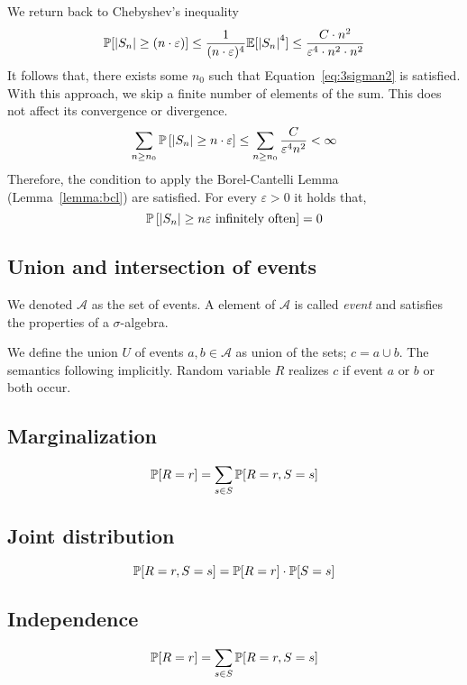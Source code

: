 We return back to Chebyshev's inequality
\[
    \mathbb P[\left\lvert{S_n}\right\rvert \geq (n\cdot\varepsilon)]
    \leq \frac{1}{(n\cdot\varepsilon)^4} \mathbb E[\left\lvert{S_n}\right\rvert^4]
    \leq \frac{C \cdot n^2}{\varepsilon^4 \cdot n^2 \cdot n^2}
\]
It follows that, there exists some $n_0$ such that Equation~\eqref{eq:3sigman2} is satisfied.
With this approach, we skip a finite number of elements of the sum. This does not affect its convergence or divergence.
\[
    \sum_{n \geq n_0} \mathbb P\left[\left\lvert{S_n}\right\rvert \geq n \cdot \varepsilon\right]
    \leq \sum_{n \geq n_0} \frac{C}{\varepsilon^4 n^2} < \infty
\]
Therefore, the condition to apply the Borel-Cantelli Lemma (Lemma~\ref{lemma:bcl}) are satisfied.
For every $\varepsilon > 0$ it holds that,
\[ \mathbb P\left[\left\lvert{S_n}\right\rvert \geq n \varepsilon \text{ infinitely often}\right] = 0 \]

\subsection{Union and intersection of events}
\label{sec:bp-unin}
%
We denoted $\mathcal A$ as the set of events.
A element of $\mathcal A$ is called \emph{event} and satisfies the
properties of a $\sigma$-algebra.

We define the union $U$ of events $a,b \in \mathcal A$ as union of the sets; $c = a \cup b$.
The semantics following implicitly. Random variable $R$ realizes $c$ if event $a$ or $b$ or both occur.


\subsection{Marginalization}
\label{sec:bp-marginalization}
%
\[ \mathbb P[R=r] = \sum_{s \in S} \mathbb P[R=r, S=s] \]


\subsection{Joint distribution}
\label{sec:bp-joint-distribution}
%
\[ \mathbb P[R=r, S=s] = \mathbb P[R=r] \cdot \mathbb P[S=s] \]


\subsection{Independence}
\label{sec:bp-indep}
%
\[ \mathbb P[R=r] = \sum_{s \in S} \mathbb P[R=r, S=s] \]

